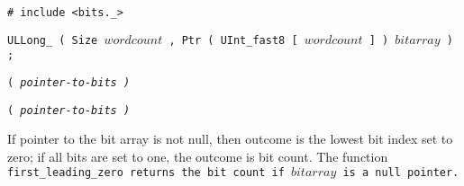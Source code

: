 
\tt{# include <bits._>}

\tt{ULLong_} \s\tt{( Size} $wordcount$
\tt{, Ptr ( UInt_fast8 [} $wordcount$ \tt{] )} $bitarray$ \tt{) ;}

\s\tt{(}
\it{pointer-to-bits} \tt{)}

\s\s\tt{(}
\it{pointer-to-bits} \tt{)}


If pointer to the bit array is not null, then outcome is the lowest bit
index set to zero; if all bits are set to one, the outcome is bit count.
The function \tt{first_leading_zero} returns
the bit count if $bitarray$ is a null pointer.
